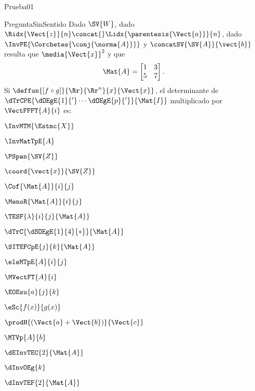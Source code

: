 \documentclass[10pt]{article}
\begin{document}

\begin{quiz}{Prueba01}
  
  \begin{multi}{PreguntaSinSentido}
    Dado $\SV{W}$, dado
    $\Ridx{\Vect{z}}{n}\concat{}\Lidx{\parentesis{\Vect{a}}}{n}$, dado
    $\InvPE{\Corchetes{\conj{\norma{A}}}}$ y
    $\concatSV{\SV{A}}{\vect{b}}$ resulta que $\media{\Vect{x}}^2$ y que
    \[
      \Mat{A}=
      \begin{bmatrix}
        1&3\\
        5&7
      \end{bmatrix}.
    \]
    Si $\deffun{[f \circ g ]}{\Rr}{\Rr^{n}}{x}{\Vect{x}}$, el
    determinante de $\dTrCPE{\dOEgE{1}{'}\cdots\dOEgE{p}{'}}{\Mat{I}}$
    multiplicado por $\VectFFFT{A}{i}$ es:
    \item $\InvMTM{\Estmc{X}}$
    \item $\InvMatTpE{A}$
    \item $\PSpan{\SV{Z}}$
    \item $\coord{\vect{x}}{\SV{Z}}$
    \item $\Cof{\Mat{A}}{i}{j}$
    \item $\MenoR{\Mat{A}}{i}{j}$
    \item $\TESF{\lambda}{i}{j}{\Mat{A}}$
    \item * $\dTrC{\dSOEgE{1}{4}{*}}{\Mat{A}}$
    \item * $\SITEFCpE{j}{k}{\Mat{A}}$
    \item $\eleMTpE{A}{i}{j}$
    \item $\MVectFT{A}{i}$
    \item $\EOEsu{a}{j}{k}$
    \item $\eSc{f(x)}{g(x)}$
    \item $\prodH{(\Vect{a}+\Vect{b})}{\Vect{c}}$
    \item $\MTVp{A}{b}$
    \item $\dEInvTEC{2}{\Mat{A}}$
    \item $\dInvOEg{k}$
    \item $\dInvTEF{2}{\Mat{A}}$

\end{multi}
\end{quiz}
\end{document}
